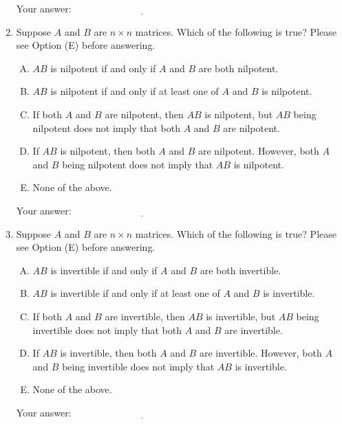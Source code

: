 \documentclass[10pt]{amsart}
\begin{document}
\begin{enumerate}
  \vspace{0.1in}
  Your answer: $\underline{\qquad\qquad\qquad\qquad\qquad\qquad\qquad}$
  \vspace{0.1in}

\item Suppose $A$ and $B$ are $n \times n$ matrices. Which of the
  following is true? Please see Option (E) before answering.

  \begin{enumerate}[(A)]
  \item $AB$ is nilpotent if and only if $A$ and $B$ are both nilpotent.
  \item $AB$ is nilpotent if and only if at least one of $A$ and $B$ is nilpotent.
  \item If both $A$ and $B$ are nilpotent, then $AB$ is nilpotent, but
    $AB$ being nilpotent does not imply that both $A$ and $B$ are
    nilpotent.
  \item If $AB$ is nilpotent, then both $A$ and $B$ are
    nilpotent. However, both $A$ and $B$ being nilpotent does not
    imply that $AB$ is nilpotent.
  \item None of the above.
  \end{enumerate}

  \vspace{0.1in}
  Your answer: $\underline{\qquad\qquad\qquad\qquad\qquad\qquad\qquad}$
  \vspace{0.1in}

\item Suppose $A$ and $B$ are $n \times n$ matrices. Which of the
  following is true? Please see Option (E) before answering.

  \begin{enumerate}[(A)]
  \item $AB$ is invertible if and only if $A$ and $B$ are both invertible.
  \item $AB$ is invertible if and only if at least one of $A$ and $B$ is invertible.
  \item If both $A$ and $B$ are invertible, then $AB$ is invertible, but
    $AB$ being invertible does not imply that both $A$ and $B$ are
    invertible.
  \item If $AB$ is invertible, then both $A$ and $B$ are
    invertible. However, both $A$ and $B$ being invertible does not
    imply that $AB$ is invertible.
  \item None of the above.
  \end{enumerate}

  \vspace{0.1in}
  Your answer: $\underline{\qquad\qquad\qquad\qquad\qquad\qquad\qquad}$
  \vspace{0.1in}


\end{enumerate}
\end{document}
